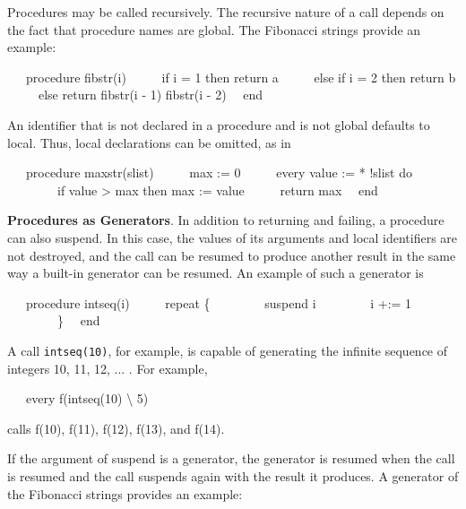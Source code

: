Procedures may be called recursively. The recursive nature of a call
depends on the fact that procedure names are global. The
{\textquotedbl}Fibonacci strings{\textquotedbl} provide an example:

{\ttfamily\mdseries
\ \ \ procedure fibstr(i)\newline
 \ \ \ \ \ if i = 1 then return {\textquotedbl}a{\textquotedbl}\newline
 \ \ \ \ \ else if i = 2 then return {\textquotedbl}b{\textquotedbl}\newline
 \ \ \ \ \ else return fibstr(i - 1) {\textbar}{\textbar} fibstr(i - 2)\newline
 \ \ end}

An identifier that is not declared in a procedure and is not global
defaults to local. Thus, local declarations can be omitted, as in

{\ttfamily\mdseries
\ \ \ procedure maxstr(slist)\newline
 \ \ \ \ \ max := 0\newline
 \ \ \ \ \ every value := * !slist do\newline
 \ \ \ \ \ \ \ \ if value {\textgreater} max then max := value\newline
 \ \ \ \ \ return max\newline
 \ \ end}


\textbf{Procedures as Generators}. In addition to returning and
failing, a procedure can also suspend. In this case, the values of its
arguments and local identifiers are not destroyed, and the call can
be resumed to produce another result in the same way a built-in
generator can be resumed. An example of such a generator is

{\ttfamily\mdseries
\ \ \ procedure intseq(i)\newline
 \ \ \ \ \ repeat \{\newline
 \ \ \ \ \ \ \ \ suspend i\newline
 \ \ \ \ \ \ \ \ i +:= 1\newline
 \ \ \ \ \ \ \ \ \}\newline
 \ \ end}

A call \texttt{intseq(10)}, for example, is capable of generating the
infinite sequence of integers 10, 11, 12, ... .  For example,

{\ttfamily\mdseries
\ \ \ every f(intseq(10) {\textbackslash} 5)}

\noindent
calls f(10), f(11), f(12), f(13), and f(14).

If the argument of suspend is a generator, the generator is resumed
when the call is resumed and the call suspends again with the result
it produces. A generator of the Fibonacci strings provides an example:

